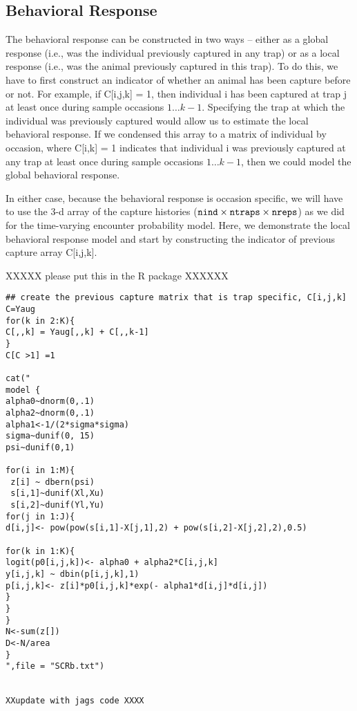 \subsection{Behavioral Response}

The behavioral response can be constructed in two ways -- either as a 
global response (i.e., was the individual previously captured in any trap) or 
as a local response (i.e., was the animal previously captured in this
trap).  To do this, we have to first
construct an indicator of whether an animal has been capture before or not.  For 
example, if C[i,j,k] = 1, then individual i has been captured at trap j
 at least once during
sample occasions $1 \dots k-1$.  Specifying the trap at which the individual was
previously captured would allow us to estimate the local behavioral response.  If 
we condensed this array to a matrix of individual by occasion, where C[i,k] = 1 indicates
that individual i was previously captured at any trap at least once during
sample occasions $1 \dots k-1$, then we 
could model the global behavioral response.  

In either case, because the behavioral response is occasion specific, we will have to use the 3-d array of the
capture histories ($\mbox{\tt nind} \times \mbox{\tt ntraps} \times
\mbox{\tt nreps}$) as we did for the time-varying encounter probability
model. 
Here, we demonstrate the local behavioral response model and start by constructing the
indicator of previous capture array C[i,j,k]. 

XXXXX please put this in the R package XXXXXX

{\small
\begin{verbatim}
## create the previous capture matrix that is trap specific, C[i,j,k]
C=Yaug
for(k in 2:K){
C[,,k] = Yaug[,,k] + C[,,k-1]
}
C[C >1] =1

cat("
model {
alpha0~dnorm(0,.1)
alpha2~dnorm(0,.1)
alpha1<-1/(2*sigma*sigma)
sigma~dunif(0, 15)
psi~dunif(0,1)

for(i in 1:M){
 z[i] ~ dbern(psi)
 s[i,1]~dunif(Xl,Xu)
 s[i,2]~dunif(Yl,Yu)
for(j in 1:J){
d[i,j]<- pow(pow(s[i,1]-X[j,1],2) + pow(s[i,2]-X[j,2],2),0.5)

for(k in 1:K){
logit(p0[i,j,k])<- alpha0 + alpha2*C[i,j,k]
y[i,j,k] ~ dbin(p[i,j,k],1)
p[i,j,k]<- z[i]*p0[i,j,k]*exp(- alpha1*d[i,j]*d[i,j])
}
}
}
N<-sum(z[])
D<-N/area
}
",file = "SCRb.txt")


XXupdate with jags code XXXX

\end{verbatim}
}


